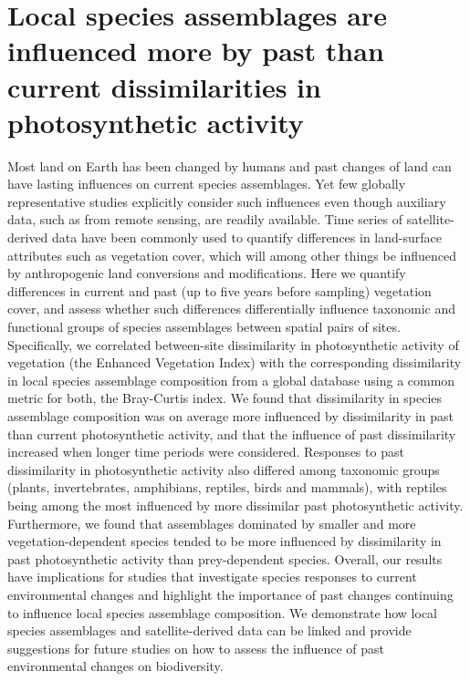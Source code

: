 \chapter{\normalsize Local species assemblages are influenced more by past than current dissimilarities in photosynthetic activity}

Most land on Earth has been changed by humans and past changes of land can have lasting influences on current species assemblages. Yet few globally representative studies explicitly consider such influences even though auxiliary data, such as from remote sensing, are readily available. Time series of satellite-derived data have been commonly used to quantify differences in land-surface attributes such as vegetation cover, which will among other things be influenced by anthropogenic land conversions and modifications. Here we quantify differences in current and past (up to five years before sampling) vegetation cover, and assess whether such differences differentially influence taxonomic and functional groups of species assemblages between spatial pairs of sites. Specifically, we correlated between-site dissimilarity in photosynthetic activity of vegetation (the Enhanced Vegetation Index) with the corresponding dissimilarity in local species assemblage composition from a global database using a common metric for both, the Bray-Curtis index. We found that dissimilarity in species assemblage composition was on average more influenced by dissimilarity in past than current photosynthetic activity, and that the influence of past dissimilarity increased when longer time periods were considered. Responses to past dissimilarity in photosynthetic activity also differed among taxonomic groups (plants, invertebrates, amphibians, reptiles, birds and mammals), with reptiles being among the most influenced by more dissimilar past photosynthetic activity. Furthermore, we found that assemblages dominated by smaller and more vegetation-dependent species tended to be more influenced by dissimilarity in past photosynthetic activity than prey-dependent species. Overall, our results have implications for studies that investigate species responses to current environmental changes and highlight the importance of past changes continuing to influence local species assemblage composition. We demonstrate how local species assemblages and satellite-derived data can be linked and provide suggestions for future studies on how to assess the influence of past environmental changes on biodiversity.

